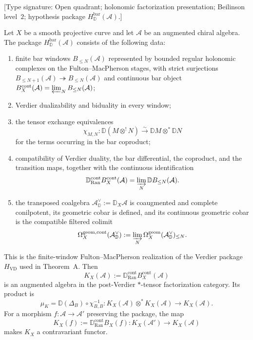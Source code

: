 \begin{theorem}\label{thm:bar-cobar-verdier}
\label{thm:verdier-bar-cobar}
\textup{[Type signature: Open quadrant; holonomic factorization
presentation; Beilinson level~$2$; hypothesis package
$H_{\mathbb D}^{\mathrm{bar}}(\mathcal A)$.]}

Let $X$ be a smooth projective curve and let $\mathcal A$ be an
augmented chiral algebra.  The package
$H_{\mathbb D}^{\mathrm{bar}}(\mathcal A)$ consists of the following
data:
\begin{enumerate}[label=\textup{(V\arabic*)}]
\item finite bar windows $B_{\leq N}(\mathcal A)$ represented by
 bounded regular holonomic complexes on the Fulton--MacPherson stages,
 with strict surjections
 $B_{\leq N+1}(\mathcal A)\twoheadrightarrow B_{\leq N}(\mathcal A)$
 and continuous bar object
 $B_X^{\mathrm{cont}}(\mathcal A)=\varprojlim_NB_{\leq N}(\mathcal A)$;
\item Verdier dualizability and biduality in every window;
\item the tensor exchange equivalences
 \[
 \chi_{M,N}\colon
 \mathbb D(M\otimes^!N)\xrightarrow{\sim}
 \mathbb DM\otimes^*\mathbb DN
 \]
 for the terms occurring in the bar coproduct;
\item compatibility of Verdier duality, the bar differential, the
 coproduct, and the transition maps, together with the continuous
 identification
 \[
 \mathbb D_{\operatorname{Ran}}^{\mathrm{cont}}
 B_X^{\mathrm{cont}}(\mathcal A)
 =\varinjlim_N\mathbb D B_{\leq N}(\mathcal A).
 \]
\item the transposed coalgebra
 $\mathcal A_{\mathbb D}^{\vee}:=\mathbb D_X\mathcal A$ is
 coaugmented and complete conilpotent, its geometric cobar is defined,
 and its continuous geometric cobar is the compatible filtered colimit
 \[
 \Omega_X^{\mathrm{geom,cont}}(\mathcal A_{\mathbb D}^{\vee})
 :=\varinjlim_N
 \Omega_X^{\mathrm{geom}}(\mathcal A_{\mathbb D}^{\vee})_{\leq N}.
 \]
\end{enumerate}
This is the finite-window Fulton--MacPherson realization of the
Verdier package $H_{\mathrm{VD}}$ used in Theorem~A.
Then
\[
K_X(\mathcal A):=
\mathbb D_{\operatorname{Ran}}^{\mathrm{cont}}
B_X^{\mathrm{cont}}(\mathcal A)
\]
is an augmented algebra in the post-Verdier $*$-tensor
factorization category.  Its product is
\[
\mu_K=
\mathbb D(\Delta_B)\circ\chi_{B,B}^{-1}\colon
K_X(\mathcal A)\otimes^*K_X(\mathcal A)\longrightarrow K_X(\mathcal A).
\]
For a morphism $f\colon\mathcal A\to\mathcal A'$ preserving the
package, the map
\[
K_X(f):=\mathbb D_{\operatorname{Ran}}^{\mathrm{cont}}B_X(f)\colon
K_X(\mathcal A')\longrightarrow K_X(\mathcal A)
\]
makes $K_X$ a contravariant functor.


\end{theorem}
